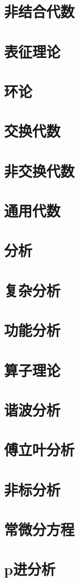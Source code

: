 \section{非结合代数}
\section{表征理论}
\section{环论}
\section{交换代数}
\section{非交换代数}
\section{通用代数}
\section{分析}
\section{复杂分析}
\section{功能分析}
\section{算子理论}
\section{谐波分析}
\section{傅立叶分析}
\section{非标分析}
\section{常微分方程}
\section{p进分析}
